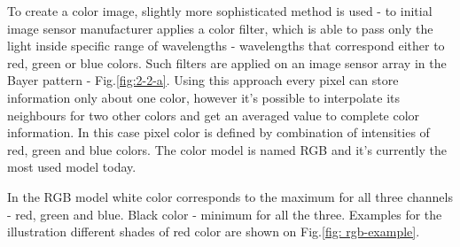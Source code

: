 \documentclass{ctuthesis}
\begin{document}
To create a color image, slightly more sophisticated method is used - to initial image sensor manufacturer applies a color filter, which is able to pass only the light inside specific range of wavelengths - wavelengths that correspond either to red, green or blue colors. Such filters are applied on an image sensor array in the Bayer pattern - Fig.\ref{fig:2-2-a}. Using this approach every pixel can store information only about one color, however it's possible to interpolate its neighbours for two other colors and get an averaged value to complete color information. In this case pixel color is defined by combination of intensities of red, green and blue colors. The color model is named RGB and it's currently the most used model today.

In the RGB model white color corresponds to the maximum for all three channels - red, green and blue. Black color - minimum for all the three. Examples for the illustration different shades of red color are shown on Fig.\ref{fig: rgb-example}.
\end{document}
